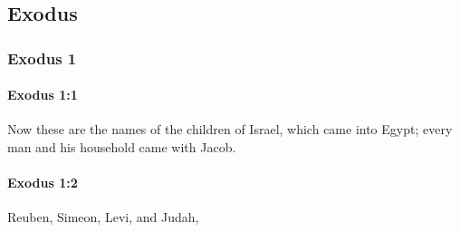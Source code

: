 \subsection{Exodus}
	\label{EXODUS}

	\subsubsection{Exodus 1} %
		\label{EXODUS-1}

		\paragraph{Exodus 1:1} %
			\label{EXODUS-1-1}

			Now these are the names of the children of Israel, which came into Egypt; every man and his household came with Jacob.


		\paragraph{Exodus 1:2} %
			\label{EXODUS-1-2}

			Reuben, Simeon, Levi, and Judah,

